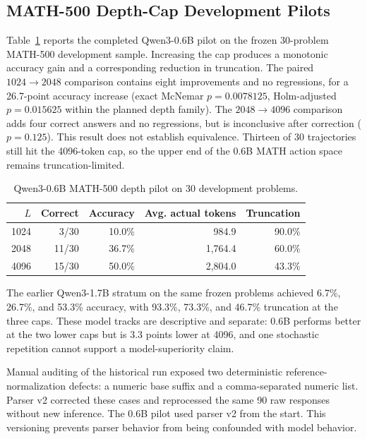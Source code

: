 \documentclass[runningheads]{llncs}
\begin{document}
\subsection{MATH-500 Depth-Cap Development Pilots}

Table~\ref{tab:mathpilot} reports the completed Qwen3-0.6B pilot on the frozen
30-problem MATH-500 development sample. Increasing the cap produces a monotonic
accuracy gain and a corresponding reduction in truncation. The paired
$1024\rightarrow2048$ comparison contains eight improvements and no
regressions, for a 26.7-point accuracy increase (exact McNemar
$p=0.0078125$, Holm-adjusted $p=0.015625$ within the planned depth family).
The $2048\rightarrow4096$ comparison adds four correct answers and no
regressions, but is inconclusive after correction ($p=0.125$). This result does
not establish equivalence. Thirteen of 30 trajectories still hit the
4096-token cap, so the upper end of the 0.6B MATH action space remains
truncation-limited.

\begin{table}
\caption{Qwen3-0.6B MATH-500 depth pilot on 30 development problems.}
\label{tab:mathpilot}
\centering
\begin{tabular}{r|r|r|r|r}
\hline
$L$ & Correct & Accuracy & Avg. actual tokens & Truncation \\
\hline
1024 & 3/30  & 10.0\% & 984.9   & 90.0\% \\
2048 & 11/30 & 36.7\% & 1,764.4 & 60.0\% \\
4096 & 15/30 & 50.0\% & 2,804.0 & 43.3\% \\
\hline
\end{tabular}
\end{table}

The earlier Qwen3-1.7B stratum on the same frozen problems achieved 6.7\%,
26.7\%, and 53.3\% accuracy, with 93.3\%, 73.3\%, and 46.7\% truncation at the
three caps. These model tracks are descriptive and separate: 0.6B performs
better at the two lower caps but is 3.3 points lower at 4096, and one
stochastic repetition cannot support a model-superiority claim.

Manual auditing of the historical run exposed two deterministic
reference-normalization defects: a numeric base suffix and a comma-separated
numeric list. Parser v2 corrected these cases and reprocessed the same 90 raw
responses without new inference. The 0.6B pilot used parser v2 from the start.
This versioning prevents parser behavior from being confounded with model
behavior.
\end{document}
